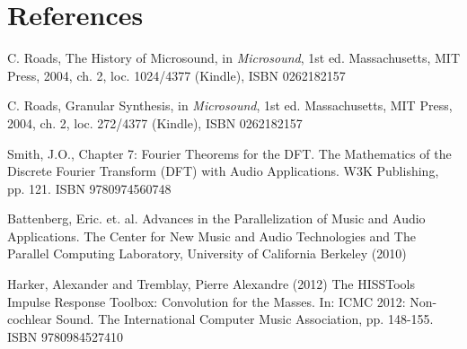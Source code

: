 \documentclass{article}
\begin{document}
 	\section{References}
		\begin{thebibliography}{99}
		 C. Roads, The History of Microsound, in \emph{Microsound}, 1st ed. Massachusetts, MIT Press, 2004, ch. 2, loc. 1024/4377 (Kindle), ISBN 0262182157

		 C. Roads, Granular Synthesis, in \emph{Microsound}, 1st ed. Massachusetts, MIT Press, 2004, ch. 2, loc. 272/4377 (Kindle), ISBN 0262182157

		 Smith, J.O., Chapter 7: Fourier Theorems for the DFT. The Mathematics of the Discrete Fourier Transform (DFT) with Audio Applications. W3K Publishing, pp. 121. ISBN 9780974560748

		 Battenberg, Eric. et. al. Advances in the Parallelization of Music and Audio Applications. The Center for New Music and Audio Technologies and The Parallel Computing Laboratory, University of California Berkeley (2010)

		 Harker, Alexander and Tremblay, Pierre Alexandre (2012) The HISSTools Impulse Response Toolbox: Convolution for the Masses. In: ICMC 2012: Non-cochlear Sound. The International Computer Music Association, pp. 148-155. ISBN 9780984527410
		\end{thebibliography}
\end{document}
